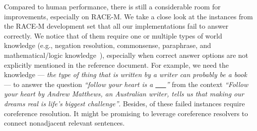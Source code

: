 \documentclass[11pt,a4paper]{article}
\newcommand{\eg}{{e.g.}}
\begin{document}
Compared to human performance, there is still a considerable room for improvements, especially on RACE-M. We take a close look at the instances from the RACE-M development set that all our implementations fail to answer correctly. We notice that  of them require one or multiple types of world knowledge (\eg, negation resolution, commonsense, paraphrase, and mathematical/logic knowledge~\cite{sugawara2017prerequisite,sugawara2017evaluation,sugawara2018makes}), especially when correct answer options are not explicitly mentioned in the reference document. For example, we need the knowledge --- \emph{the type of thing that is written by a writer can probably be a book} --- to answer the question \emph{``follow your heart is a \underline{~~~}''} from the context \emph{``Follow your heart by Andrew Matthews, an Australian writer, tells us that making our dreams real is life's biggest challenge''}. Besides,  of these failed instances require coreference resolution. It might be promising to leverage coreference resolvers to connect nonadjacent relevant sentences.
\end{document}
